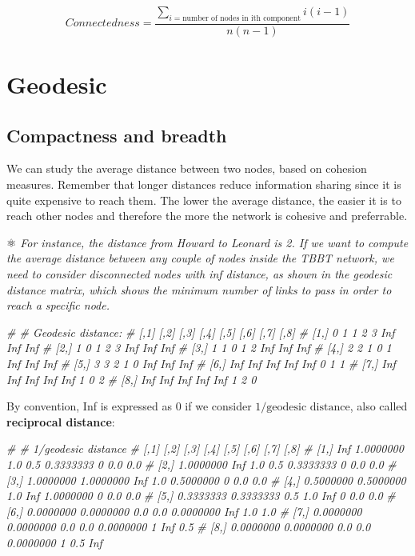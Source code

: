 \documentclass[
  notitlepage,
  onecolumn,
  openany]{book}
\newenvironment{Shaded}{\begin{snugshade}}{\end{snugshade}}
\newcommand{\CommentTok}[1]{\textcolor[rgb]{0.56,0.35,0.01}{\textit{#1}}}
\begin{document}
\[
Connectedness = \frac{\sum_{i = \text{number of nodes in ith component}} i(i-1)}{n(n-1)}
\]

\hypertarget{geodesic}{%
\section{Geodesic}\label{geodesic}}

\hypertarget{compactness-and-breadth}{%
\subsection{Compactness and breadth}\label{compactness-and-breadth}}

We can study the average distance between two nodes, based on cohesion measures. Remember that longer distances reduce information sharing since it is quite expensive to reach them. The lower the average distance, the easier it is to reach other nodes and therefore the more the network is cohesive and preferrable.

⚛️ \emph{For instance, the distance from Howard to Leonard is 2. If we want to compute the average distance between any couple of nodes inside the TBBT network, we need to consider disconnected nodes with inf distance, as shown in the geodesic distance matrix, which shows the minimum number of links to pass in order to reach a specific node.}

\begin{Shaded}
\begin{Highlighting}[]
\CommentTok{\# \# Geodesic distance:}
\CommentTok{\#       [,1] [,2] [,3] [,4] [,5] [,6] [,7] [,8]}
\CommentTok{\# [1,] 0 1 1 2 3 Inf Inf Inf}
\CommentTok{\# [2,] 1 0 1 2 3 Inf Inf Inf}
\CommentTok{\# [3,] 1 1 0 1 2 Inf Inf Inf}
\CommentTok{\# [4,] 2 2 1 0 1 Inf Inf Inf}
\CommentTok{\# [5,] 3 3 2 1 0 Inf Inf Inf}
\CommentTok{\# [6,] Inf Inf Inf Inf Inf 0 1 1}
\CommentTok{\# [7,] Inf Inf Inf Inf Inf 1 0 2}
\CommentTok{\# [8,] Inf Inf Inf Inf Inf 1 2 0}
\end{Highlighting}
\end{Shaded}

By convention, Inf is expressed as 0 if we consider \(1/\text{geodesic distance}\), also called \textbf{reciprocal distance}:

\begin{Shaded}
\begin{Highlighting}[]
\CommentTok{\# \# 1/geodesic distance}
\CommentTok{\# [,1] [,2] [,3] [,4] [,5] [,6] [,7] [,8]}
\CommentTok{\# [1,] Inf 1.0000000 1.0 0.5 0.3333333 0 0.0 0.0}
\CommentTok{\# [2,] 1.0000000 Inf 1.0 0.5 0.3333333 0 0.0 0.0}
\CommentTok{\# [3,] 1.0000000 1.0000000 Inf 1.0 0.5000000 0 0.0 0.0}
\CommentTok{\# [4,] 0.5000000 0.5000000 1.0 Inf 1.0000000 0 0.0 0.0}
\CommentTok{\# [5,] 0.3333333 0.3333333 0.5 1.0 Inf 0 0.0 0.0}
\CommentTok{\# [6,] 0.0000000 0.0000000 0.0 0.0 0.0000000 Inf 1.0 1.0}
\CommentTok{\# [7,] 0.0000000 0.0000000 0.0 0.0 0.0000000 1 Inf 0.5}
\CommentTok{\# [8,] 0.0000000 0.0000000 0.0 0.0 0.0000000 1 0.5 Inf}
\end{Highlighting}
\end{Shaded}
\end{document}
